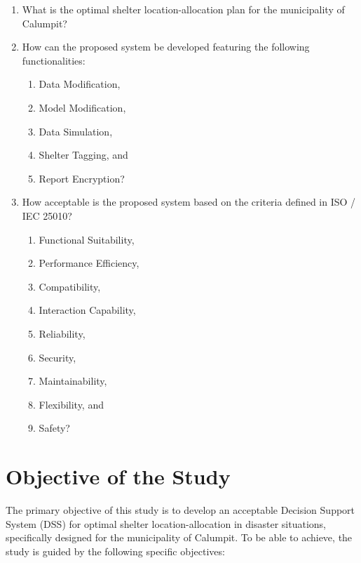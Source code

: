 	\begin{enumerate}
		\item What is the optimal shelter location-allocation plan for the municipality of Calumpit?
		\item How can the proposed system be developed featuring the following functionalities:
		\begin{enumerate}
			\item Data Modification,
			\item Model Modification,
			\item Data Simulation,
			\item Shelter Tagging, and
			\item Report Encryption?
		\end{enumerate}
		\item How acceptable is the proposed system based on the  criteria defined in ISO / IEC 25010?
		\begin{enumerate}
			\item Functional Suitability,
			\item Performance Efficiency,
			\item Compatibility,
			\item Interaction Capability,
			\item Reliability,
			\item Security,
			\item Maintainability,
			\item Flexibility, and
			\item Safety?
		\end{enumerate}
	\end{enumerate}
	
\section{Objective of the Study}
	The primary objective of this study is to develop an acceptable Decision Support System (DSS) for optimal shelter location-allocation in disaster situations, specifically designed for the municipality of Calumpit. To be able to achieve, the study is guided by the following specific objectives:
	
